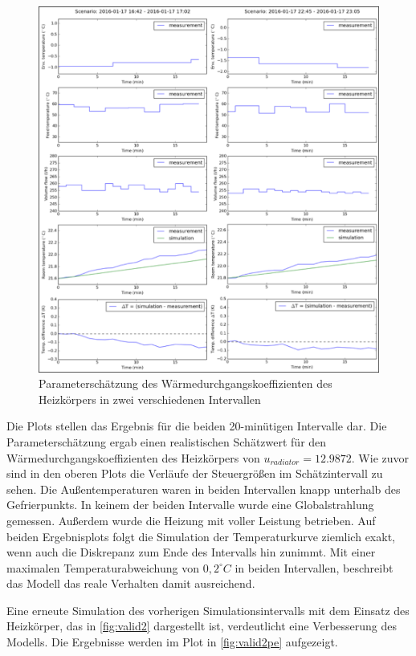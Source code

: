 \begin{figure}
\centering
\includegraphics[width=\textwidth]{abbildungen/20160329_pestep3}
\caption{Parameterschätzung des Wärmedurchgangskoeffizienten des Heizkörpers in zwei verschiedenen Intervallen}
\label{fig:step3}
\end{figure}

Die Plots stellen das Ergebnis für die beiden 20-minütigen Intervalle dar. Die Parameterschätzung ergab einen realistischen Schätzwert für den Wärmedurchgangskoeffizienten des Heizkörpers von $u_{radiator}=12.9872$.
Wie zuvor sind in den oberen Plots die Verläufe der Steuergrößen im Schätzintervall zu sehen. Die Außentemperaturen waren in beiden Intervallen knapp unterhalb des Gefrierpunkts. In keinem der beiden Intervalle wurde eine Globalstrahlung gemessen. Außerdem wurde die Heizung mit voller Leistung betrieben.
Auf beiden Ergebnisplots folgt die Simulation der Temperaturkurve ziemlich exakt, wenn auch die Diskrepanz zum Ende des Intervalls hin zunimmt. Mit einer maximalen Temperaturabweichung von $0,2^{\circ}C$ in beiden Intervallen, beschreibt das Modell das reale Verhalten damit ausreichend.

Eine erneute Simulation des vorherigen Simulationsintervalls mit dem Einsatz des Heizkörper, das in \ref{fig:valid2} dargestellt ist, verdeutlicht eine Verbesserung des Modells. Die Ergebnisse werden im Plot in \ref{fig:valid2pe} aufgezeigt.

